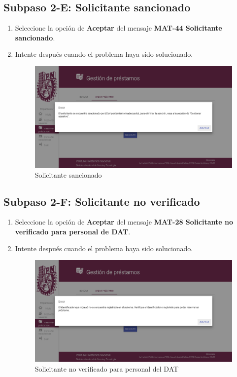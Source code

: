 \subsection{Subpaso 2-E: Solicitante sancionado}
\begin{enumerate}
	\item Seleccione la opción de \textbf{Aceptar} del mensaje
\textbf{MAT-44 Solicitante sancionado}.
	\item Intente después cuando el problema haya sido
solucionado.
\begin{figure}[hbtp]
	\includegraphics[scale=0.3]{images/Interfaz/MAT-44 Solicitante sancionado.png}
	\caption{Solicitante sancionado}
	\end{figure}
\end{enumerate}

\subsection{Subpaso 2-F: Solicitante no verificado}
\begin{enumerate}
	\item Seleccione la opción de \textbf{Aceptar} del mensaje
\textbf{MAT-28 Solicitante no verificado para personal de DAT}.
	\item Intente después cuando el problema haya sido
solucionado.
\begin{figure}[hbtp]
	\includegraphics[scale=0.3]{images/Interfaz/MAT-28 Solicitante no verificado para personal del DAT.png}
	\caption{Solicitante no verificado para personal del DAT}
	\end{figure}
\end{enumerate}

